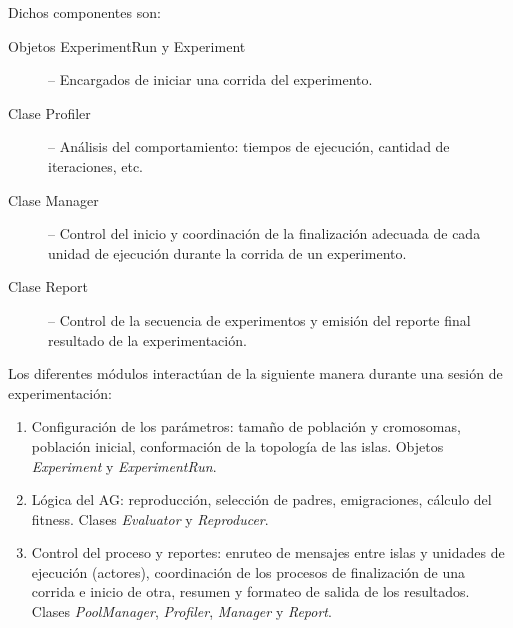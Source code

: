 \noindent  Dichos componentes son:
\begin{description}

  \item[Objetos ExperimentRun y Experiment] -- Encargados de iniciar una corrida del experimento.

  \item[Clase Profiler] -- Análisis del comportamiento: tiempos de ejecución, cantidad de iteraciones, etc.

  \item[Clase Manager] -- Control del inicio y coordinación de la finalización adecuada de cada unidad de ejecución durante la corrida de un experimento.

  \item[Clase Report] -- Control de la secuencia de experimentos y emisión del reporte final resultado de la experimentación.

\end{description}

\noindent Los diferentes módulos interactúan de la siguiente manera durante una sesión de experimentación:

\begin{enumerate}

  \item Configuración de los parámetros: tamaño de población y cromosomas, población inicial, conformación de la topología de las islas. Objetos {\em Experiment} y {\em ExperimentRun}.

  \item Lógica del AG: reproducción, selección de padres, emigraciones, cálculo del fitness. Clases {\em Evaluator} y {\em Reproducer}.

  \item Control del proceso y reportes: enruteo de mensajes entre islas y unidades de ejecución (actores), coordinación de los procesos de finalización de una corrida e inicio de otra, resumen y formateo de salida de los resultados. Clases {\em PoolManager}, {\em Profiler}, {\em Manager} y {\em Report}.

\end{enumerate}
